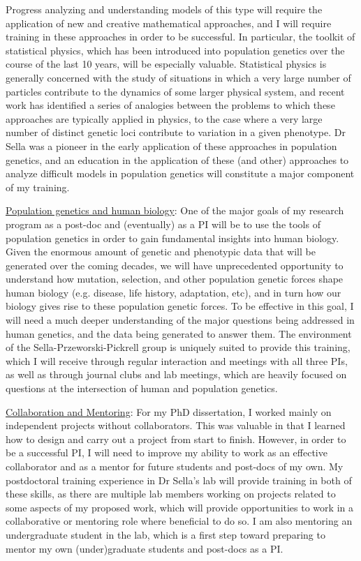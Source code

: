 \documentclass[11pt]{article}
\begin{document}
Progress analyzing and understanding models of this type will require the application of new and creative mathematical approaches, and I will require training in these approaches in order to be successful. In particular, the toolkit of statistical physics, which has been introduced into population genetics over the course of the last 10 years, will be especially valuable. Statistical physics is generally concerned with the study of situations in which a very large number of particles contribute to the dynamics of some larger physical system, and recent work has identified a series of analogies between the problems to which these approaches are typically applied in physics, to the case where a very large number of distinct genetic loci contribute to variation in a given phenotype. Dr Sella was a pioneer in the early application of these approaches in population genetics, and an education in the application of these (and other) approaches to analyze difficult models in population genetics will constitute a major component of my training.

\underline{Population genetics and human biology}: One of the major goals of my research program as a post-doc and (eventually) as a PI will be to use the tools of population genetics in order to gain fundamental insights into human biology. Given the enormous amount of genetic and phenotypic data that will be generated over the coming decades, we will have unprecedented opportunity to understand how mutation, selection, and other population genetic forces shape human biology (e.g. disease, life history, adaptation, etc), and in turn how our biology gives rise to these population genetic forces. To be effective in this goal, I will need a much deeper understanding of the major questions being addressed in human genetics, and the data being generated to answer them. The environment of the Sella-Przeworski-Pickrell group is uniquely suited to provide this training, which I will receive through regular interaction and meetings with all three PIs, as well as through journal clubs and lab meetings, which are heavily focused on questions at the intersection of human and population genetics. 


\underline{Collaboration and Mentoring}: For my PhD dissertation, I worked mainly on independent projects without collaborators. This was valuable in that I learned how to design and carry out a project from start to finish. However, in order to be a successful PI, I will need to improve my ability to work as an effective collaborator and as a mentor for future students and post-docs of my own. My postdoctoral training experience in Dr Sella's lab will provide training in both of these skills, as there are multiple lab members working on projects related to some aspects of my proposed work, which will provide opportunities to work in a collaborative or mentoring role where beneficial to do so. I am also mentoring an undergraduate student in the lab, which is a first step toward preparing to mentor my own (under)graduate students and post-docs as a PI. 
\end{document}
